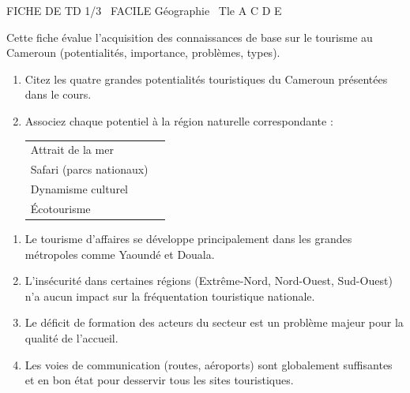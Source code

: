 \documentclass[11pt]{article}
\begin{document}
\begin{tcolorbox}[enhanced,colback=popink,colframe=popink,arc=10pt,boxrule=0pt,left=12pt,right=12pt,top=9pt,bottom=9pt]
{\color{white}\popxbold\small FICHE DE TD 1/3 \textbullet\ FACILE \hfill Géographie \textbullet\ Tle A C D E\par}
\end{tcolorbox}
\vspace{4pt}
Cette fiche évalue l'acquisition des connaissances de base sur le tourisme au Cameroun (potentialités, importance, problèmes, types).

\begin{exercice}
\begin{enumerate}
    \item Citez les quatre grandes potentialités touristiques du Cameroun présentées dans le cours.
    \item Associez chaque potentiel à la région naturelle correspondante :
    \begin{tabular}{ll}
    Attrait de la mer & \dotfill \\
    Safari (parcs nationaux) & \dotfill \\
    Dynamisme culturel & \dotfill \\
    Écotourisme & \dotfill
    \end{tabular}
\end{enumerate}
\end{exercice}

\begin{exercice}
\begin{enumerate}
    \item Le tourisme d'affaires se développe principalement dans les grandes métropoles comme Yaoundé et Douala.
    \item L'insécurité dans certaines régions (Extrême-Nord, Nord-Ouest, Sud-Ouest) n'a aucun impact sur la fréquentation touristique nationale.
    \item Le déficit de formation des acteurs du secteur est un problème majeur pour la qualité de l'accueil.
    \item Les voies de communication (routes, aéroports) sont globalement suffisantes et en bon état pour desservir tous les sites touristiques.
\end{enumerate}
\end{exercice}
\end{document}
